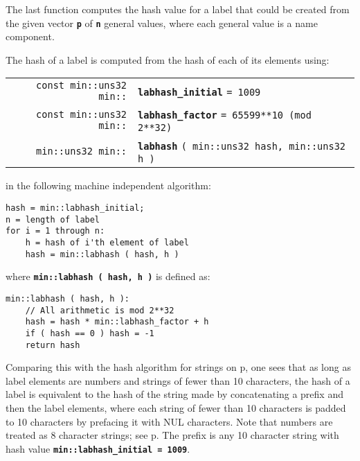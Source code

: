 \documentclass[12pt]{article}
\makeatletter
\newcommand{\TT}[1]{{\tt \bfseries #1}}
\newcommand{\ttindex}[1]{\index{#1@{\tt #1}}}
\newcommand{\minindex}[1]{\ttindex{min::#1}\ttindex{#1}}
\newcommand{\pagref}[1]{p\pageref{#1}}
\newcommand{\EOL}{\penalty \exhyphenpenalty}
\newenvironment{indpar}[1][0.3in]%
	{\begin{list}{}%
		     {\setlength{\itemsep}{0in}%
		      \setlength{\topsep}{0in}%
		      \setlength{\parsep}{1ex}%
		      \setlength{\labelwidth}{#1}%
		      \setlength{\leftmargin}{#1}%
		      \addtolength{\leftmargin}{\labelsep}}%
	 \item}%
	{\end{list}}
\newcommand{\LABEL}[1]{\label{#1}}
\newcommand{\MINKEY}[1]{{\tt \bf #1}\minindex{#1}}
\makeatother
\begin{document}
The last function computes the hash value for a label that could be created
from the given vector \TT{p} of \TT{n} general values, where each
general value is a name component.

The hash of a label is computed from
the hash of each of its elements using:

\begin{indpar}\begin{tabular}{r@{}l}
\verb|const min::uns32 min::| & \MINKEY{labhash\_initial} \verb|= 1009|
\LABEL{MIN::LABHASH_INITIAL} \\
\verb|const min::uns32 min::| & \MINKEY{labhash\_factor}
    \verb|= 65599**10 (mod 2**32)|
\LABEL{MIN::LABHASH_FACTOR} \\
\verb|min::uns32 min::| & \MINKEY{labhash}
     \verb|( min::uns32 hash, min::uns32 h )|
\LABEL{MIN::LABHASH_INCREMENTAL} \\
\end{tabular}\end{indpar}

in the following machine independent algorithm:\label{LABEL-HASH-ALGORITHM}

\begin{indpar}\begin{verbatim}
hash = min::labhash_initial;
n = length of label
for i = 1 through n:
    h = hash of i'th element of label
    hash = min::labhash ( hash, h )
\end{verbatim}\end{indpar}

where \TT{min::labhash ( hash, h )} is defined as:

\begin{indpar}\begin{verbatim}
min::labhash ( hash, h ):
    // All arithmetic is mod 2**32
    hash = hash * min::labhash_factor + h
    if ( hash == 0 ) hash = -1
    return hash
\end{verbatim}\end{indpar}

Comparing this with the hash algorithm for strings
on \pagref{HASH-ALGORITHM}, one sees that as long as
label elements are numbers and strings of fewer than 10 characters,
the hash of a label is equivalent to the hash of the
string made by concatenating a prefix and then the label elements, where each
string of fewer than 10 characters is padded to 10 characters
by prefacing it with NUL characters.  Note that
numbers are treated as 8 character strings; see
\pagref{NUMBER-HASH-ALGORITHM}.  The prefix is any 10 character string with
hash value \TT{min::\EOL labhash\_\EOL initial = 1009}.
\end{document}
